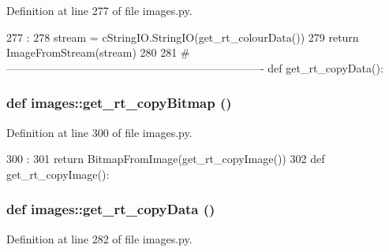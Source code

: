 Definition at line 277 of file images.py.


\begin{DoxyCode}
277                         :
278     stream = cStringIO.StringIO(get_rt_colourData())
279     return ImageFromStream(stream)
280 
281 #----------------------------------------------------------------------
def get_rt_copyData():
\end{DoxyCode}
\hypertarget{namespaceimages_aedff5b143a4964815b0074d0acf90151}{
\subsubsection[{get\_\-rt\_\-copyBitmap}]{\setlength{\rightskip}{0pt plus 5cm}def images::get\_\-rt\_\-copyBitmap ()}}
\label{namespaceimages_aedff5b143a4964815b0074d0acf90151}


Definition at line 300 of file images.py.


\begin{DoxyCode}
300                        :
301     return BitmapFromImage(get_rt_copyImage())
302 
def get_rt_copyImage():
\end{DoxyCode}
\hypertarget{namespaceimages_a91cadc64c4dbe6f4f82babb53b92bcb7}{
\subsubsection[{get\_\-rt\_\-copyData}]{\setlength{\rightskip}{0pt plus 5cm}def images::get\_\-rt\_\-copyData ()}}
\label{namespaceimages_a91cadc64c4dbe6f4f82babb53b92bcb7}


Definition at line 282 of file images.py.


